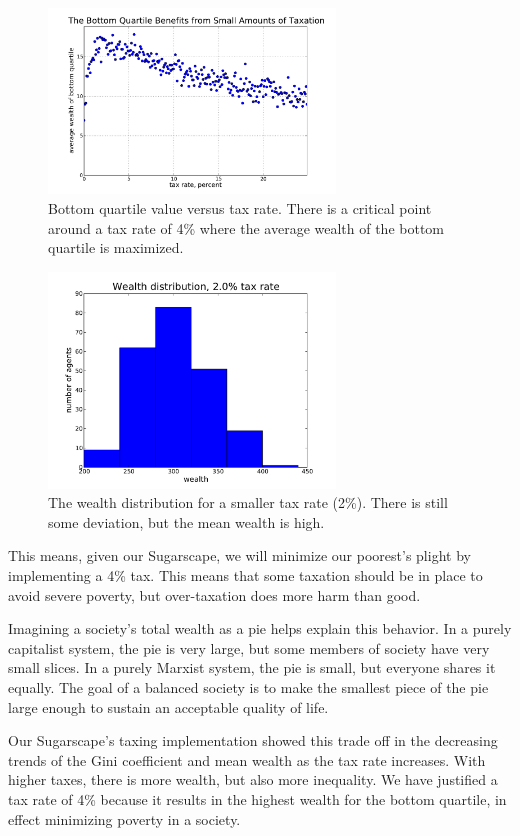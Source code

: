 \begin{figure}[ht]
\centering
\includegraphics[width=3.0in]{figs/bottom_quartile.pdf}
\caption{Bottom quartile value versus tax rate. There is a critical point around a tax rate of 4\% where the average wealth of the bottom quartile is maximized.}
\end{figure}


\begin{figure}[ht]
\centering
\includegraphics[width=3.0in]{figs/pmf_2percent.pdf}
\caption{The wealth distribution for a smaller tax rate (2\%). There is still some deviation, but the mean wealth is high.}
\end{figure}

This means, given our Sugarscape, we will minimize our poorest's plight by implementing a 4\% tax. This means that some taxation should be in place to avoid severe poverty, but over-taxation does more harm than good.

Imagining a society's total wealth as a pie helps explain this behavior. In a purely capitalist system, the pie is very large, but some members of society have very small slices. In a purely Marxist system, the pie is small, but everyone shares it equally. The goal of a balanced society is to make the smallest piece of the pie large enough to sustain an acceptable quality of life. 

Our Sugarscape’s taxing implementation showed this trade off in the decreasing trends of the Gini coefficient and mean wealth as the tax rate increases. With higher taxes, there is more wealth, but also more inequality. We have justified a tax rate of 4\% because it results in the highest wealth for the bottom quartile, in effect minimizing poverty in a society.

